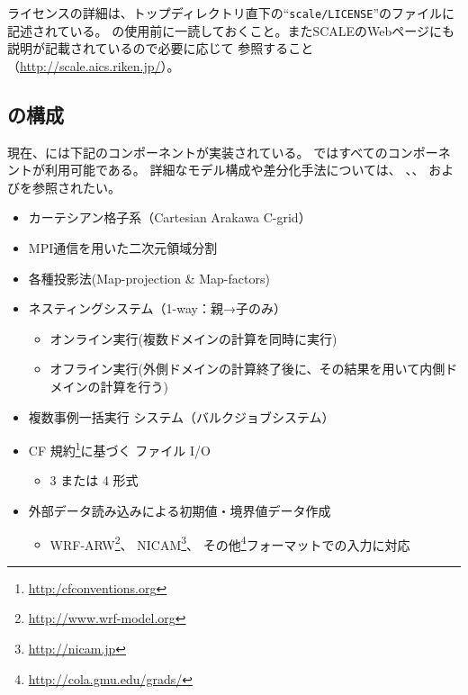 ライセンスの詳細は、トップディレクトリ直下の``\verb|scale/LICENSE|''のファイルに記述されている。
\scalelib の使用前に一読しておくこと。またSCALEのWebページにも説明が記載されているので必要に応じて
参照すること（\url{http://scale.aics.riken.jp/}）。



\subsection{\scalerm の構成}  \label{subsec:sturcture_scale_rm}
現在、\scalelib には下記のコンポーネントが実装されている。
\scalerm ではすべてのコンポーネントが利用可能である。
詳細なモデル構成や差分化手法については、
\citet{scale_2015}、\citet{satoy_2015b}、
および\citet{nishizawa_2015}を参照されたい。\\


\begin{itemize}
 \item カーテシアン格子系（Cartesian Arakawa C-grid）
 \item MPI通信を用いた二次元領域分割
 \item 各種投影法(Map-projection \& Map-factors)
 \item ネスティングシステム（1-way：親→子のみ）
   \begin{itemize}
    \item オンライン実行(複数ドメインの計算を同時に実行)
    \item オフライン実行(外側ドメインの計算終了後に、その結果を用いて内側ドメインの計算を行う)
   \end{itemize}
 \item 複数事例一括実行 システム（バルクジョブシステム）
 \item CF 規約\footnote{\url{http:/cfconventions.org}}に基づく \netcdf ファイル I/O
   \begin{itemize}
   \item {\netcdf}3 または {\netcdf}4 形式
   \end{itemize}
 \item 外部データ読み込みによる初期値・境界値データ作成
   \begin{itemize}
    \item WRF-ARW\footnote{\url{http://www.wrf-model.org}}、
NICAM\footnote{\url{http://nicam.jp}}、
その他\grads \footnote{\url{http://cola.gmu.edu/grads/}}フォーマットでの入力に対応
   \end{itemize}
\end{itemize}

